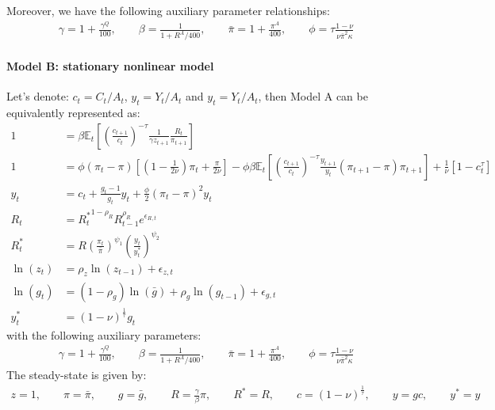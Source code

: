 Moreover, we have the following auxiliary parameter relationships:
\begin{align*}
\gamma = 1+\frac{\gamma^{Q}}{100}, \qquad
\beta = \frac{1}{1+R^{A}/400}, \qquad
\bar{\pi} = 1+\frac{\pi^{A}}{400}, \qquad
\phi=\tau\frac{1-\nu}{\nu\bar{\pi}^2\kappa}
\end{align*}

\paragraph{Model B: stationary nonlinear model}
Let's denote: $c_t= C_t/A_t$, $y_t= Y_t/A_t$ and $y_t= Y_t/A_t$, then Model A can be equivalently represented as:
\begin{align}
1 &= \beta \mathbb{E}_t\left[\left(\frac{c_{t+1}}{c_t}\right)^{-\tau} \frac{1}{\gamma z_{t+1}} \frac{R_t}{\pi_{t+1}}\right] \label{eq:AS_B1}
\\
1 &= \phi \left(\pi_t - \pi\right) \left[\left(1-\frac{1}{2\nu}\right)\pi_t + \frac{\pi}{2\nu}\right] - \phi \beta \mathbb{E}_t \left[\left(\frac{c_{t+1}}{c_t}\right)^{-\tau} \frac{y_{t+1}}{y_t} \left(\pi_{t+1} - \pi \right) \pi_{t+1}\right] + \frac{1}{\nu}\left[1-c_t^{\tau}\right]
\\
y_t &= c_t + \frac{g_t-1}{g_t} y_t + \frac{\phi}{2} \left({\pi_t - \pi}\right)^2 y_t
\\
R_t &= {R_t^{*}}^{1-\rho_R} R_{t-1}^{\rho_R} e^{\epsilon_{R,t}}
\\
R_t^* & = R \left(\frac{\pi_t}{\bar{\pi}}\right)^{\psi_1} \left(\frac{y_t}{y_t^*}\right)^{\psi_2}
\\
\ln(z_t) &= \rho_z \ln(z_{t-1}) + \epsilon_{z,t}
\\
\ln(g_t) &= (1-\rho_g)\ln(\bar{g}) + \rho_g \ln(g_{t-1}) + \epsilon_{g,t}
\\
y_t^* &= (1-\nu)^{\frac{1}{\tau}} g_t
\end{align}
with the following auxiliary parameters:
\begin{align*}
  \gamma = 1+\frac{\gamma^{Q}}{100}, \qquad
  \beta = \frac{1}{1+R^{A}/400}, \qquad
  \bar{\pi} = 1+\frac{\pi^{A}}{400}, \qquad
  \phi=\tau\frac{1-\nu}{\nu\bar{\pi}^2\kappa}
\end{align*}
The steady-state is given by:
\begin{align*}
z=1, \qquad\pi = \bar{\pi}, \qquad g=\bar{g}, \qquad R=\frac{\gamma}{\beta}\pi, \qquad R^* = R, \qquad c = (1-\nu)^{\frac{1}{\tau}}, \qquad y = gc , \qquad y^*=y
\end{align*}

